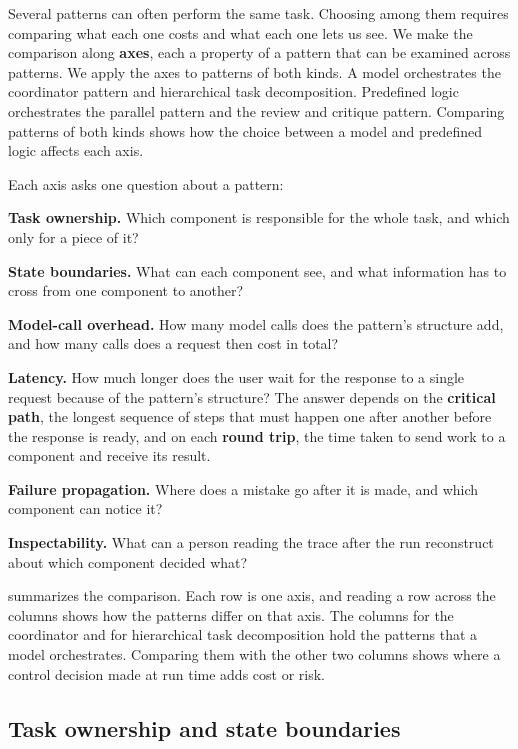 Several patterns can often perform the same task. Choosing among them requires comparing what each
one costs and what each one lets us see. We make the comparison along \textbf{axes}, each a
property of a pattern that can be examined across patterns. We apply the axes to patterns of both
kinds. A model orchestrates the coordinator pattern and hierarchical task decomposition. Predefined
logic orchestrates the parallel pattern and the review and critique pattern. Comparing patterns of
both kinds shows how the choice between a model and predefined logic affects each axis.

Each axis asks one question about a pattern:
\bi
\item \textbf{Task ownership.} Which component is responsible for the whole task, and which only
for a piece of it?
\item \textbf{State boundaries.} What can each component see, and what information has to cross
from one component to another?
\item \textbf{Model-call overhead.} How many model calls does the pattern's structure add, and how
many calls does a request then cost in total?
\item \textbf{Latency.} How much longer does the user wait for the response to a single request
because of the pattern's structure? The answer depends on the \textbf{critical path}, the longest
sequence of steps that must happen one after another before the response is ready, and on each
\textbf{round trip}, the time taken to send work to a component and receive its result.
\item \textbf{Failure propagation.} Where does a mistake go after it is made, and which component
can notice it?
\item \textbf{Inspectability.} What can a person reading the trace after the run reconstruct about
which component decided what?
\ei

 summarizes the comparison. Each row is one axis, and reading a row across
the columns shows how the patterns differ on that axis. The columns for the coordinator and for
hierarchical task decomposition hold the patterns that a model orchestrates. Comparing them with the
other two columns shows where a control decision made at run time adds cost or risk.

\subsection{Task ownership and state boundaries}
\label{sec:patterns-ownership}

